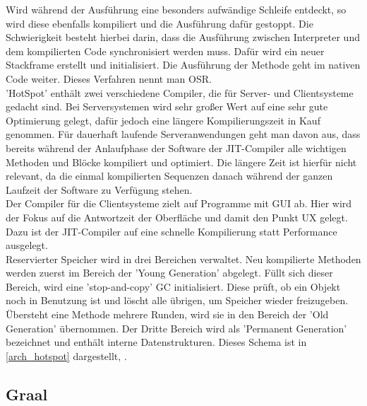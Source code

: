 Wird während der Ausführung eine besonders aufwändige Schleife entdeckt, so wird diese ebenfalls kompiliert und die Ausführung dafür gestoppt. Die Schwierigkeit besteht hierbei darin, dass die Ausführung zwischen Interpreter und dem kompilierten Code synchronisiert werden muss. Dafür wird ein neuer Stackframe erstellt und initialisiert. Die Ausführung der Methode geht im nativen Code weiter. Dieses Verfahren nennt man \ac{OSR}.\\
'HotSpot' enthält zwei verschiedene Compiler, die für Server- und Clientsysteme gedacht sind. Bei Serversystemen wird sehr großer Wert auf eine sehr gute Optimierung gelegt, dafür jedoch eine längere Kompilierungszeit in Kauf genommen. Für dauerhaft laufende Serveranwendungen geht man davon aus, dass bereits während der Anlaufphase der Software der \ac{JIT}-Compiler alle wichtigen Methoden und Blöcke kompiliert und optimiert. Die längere Zeit ist hierfür nicht relevant, da die einmal kompilierten Sequenzen danach während der ganzen Laufzeit der Software zu Verfügung stehen.\\
Der Compiler für die Clientsysteme zielt auf Programme mit \ac{GUI} ab. Hier wird der Fokus auf die Antwortzeit der Oberfläche und damit den Punkt \ac{UX} gelegt. Dazu ist der \ac{JIT}-Compiler auf eine schnelle Kompilierung statt Performance ausgelegt.\\
Reservierter Speicher wird in drei Bereichen verwaltet. Neu kompilierte Methoden werden zuerst im Bereich der 'Young Generation' abgelegt. Füllt sich dieser Bereich, wird eine 'stop-and-copy' \ac{GC} initialisiert. Diese prüft, ob ein Objekt noch in Benutzung ist und löscht alle übrigen, um Speicher wieder freizugeben. Übersteht eine Methode mehrere Runden, wird sie in den Bereich der 'Old Generation' übernommen. Der Dritte Bereich wird als 'Permanent Generation' bezeichnet und enthält interne Datenstrukturen. Dieses Schema ist in \autoref{arch_hotspot} dargestellt, \cite[vgl. Kotzmann und Wimmer 2008, S.3f]{KotzmannWimmer2008}.\\

\subsection{Graal}

